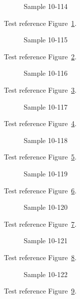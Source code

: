 \begin{figure}[tbhp]
\caption{Sample 10-114}
\label{fig:sample-10-114}
\end{figure}

Test reference Figure~\ref{fig:sample-10-114}.

\begin{figure}[tbhp]
\caption{Sample 10-115}
\label{fig:sample-10-115}
\end{figure}

Test reference Figure~\ref{fig:sample-10-115}.

\begin{figure}[tbhp]
\caption{Sample 10-116}
\label{fig:sample-10-116}
\end{figure}

Test reference Figure~\ref{fig:sample-10-116}.

\begin{figure}[tbhp]
\caption{Sample 10-117}
\label{fig:sample-10-117}
\end{figure}

Test reference Figure~\ref{fig:sample-10-117}.

\begin{figure}[tbhp]
\caption{Sample 10-118}
\label{fig:sample-10-118}
\end{figure}

Test reference Figure~\ref{fig:sample-10-118}.

\begin{figure}[tbhp]
\caption{Sample 10-119}
\label{fig:sample-10-119}
\end{figure}

Test reference Figure~\ref{fig:sample-10-119}.

\begin{figure}[tbhp]
\caption{Sample 10-120}
\label{fig:sample-10-120}
\end{figure}

Test reference Figure~\ref{fig:sample-10-120}.

\begin{figure}[tbhp]
\caption{Sample 10-121}
\label{fig:sample-10-121}
\end{figure}

Test reference Figure~\ref{fig:sample-10-121}.

\begin{figure}[tbhp]
\caption{Sample 10-122}
\label{fig:sample-10-122}
\end{figure}

Test reference Figure~\ref{fig:sample-10-122}.

